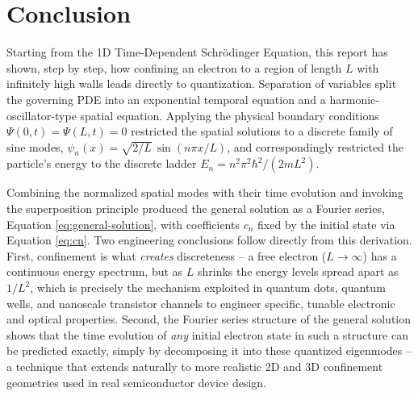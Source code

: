\documentclass[12pt, a4paper]{article}
\begin{document}
\section{Conclusion}
Starting from the 1D Time-Dependent Schr\"odinger Equation, this
report has shown, step by step, how confining an electron to a region
of length $L$ with infinitely high walls leads directly to
quantization. Separation of variables split the governing PDE into an
exponential temporal equation and a harmonic-oscillator-type spatial
equation. Applying the physical boundary conditions
$\Psi(0,t)=\Psi(L,t)=0$ restricted the spatial solutions to a discrete
family of sine modes, $\psi_n(x) = \sqrt{2/L}\,\sin(n\pi x/L)$, and
correspondingly restricted the particle's energy to the discrete
ladder $E_n = n^2\pi^2\hbar^2/(2mL^2)$.

Combining the normalized spatial modes with their time evolution and
invoking the superposition principle produced the general solution as
a Fourier series, Equation \eqref{eq:general-solution}, with
coefficients $c_n$ fixed by the initial state via Equation
\eqref{eq:cn}. Two engineering conclusions follow directly from this
derivation. First, confinement is what \emph{creates} discreteness --
a free electron ($L \to \infty$) has a continuous energy spectrum, but
as $L$ shrinks the energy levels spread apart as $1/L^2$, which is
precisely the mechanism exploited in quantum dots, quantum wells, and
nanoscale transistor channels to engineer specific, tunable electronic
and optical properties. Second, the Fourier series structure of the
general solution shows that the time evolution of \emph{any} initial
electron state in such a structure can be predicted exactly, simply by
decomposing it into these quantized eigenmodes -- a technique that
extends naturally to more realistic 2D and 3D confinement geometries
used in real semiconductor device design.
\end{document}
